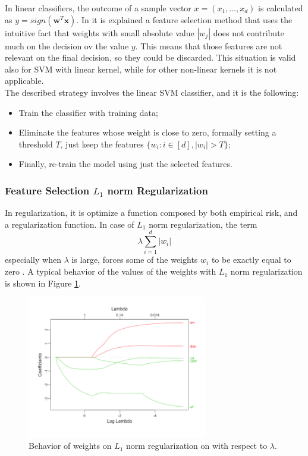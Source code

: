 In linear classifiers, the outcome of a sample vector $x = (x_1, \dots, x_d)$ is calculated as $y=sign(\mathbf{w}^T\mathbf{x})$. In \cite{Brank2002FeatureSU} it is explained a feature selection method that uses the intuitive fact that weights with small absolute value $|w_j|$ does not contribute much on the decision ov the value $y$. This means that those features are not relevant on the final decision, so they could be discarded. This situation is valid also for SVM with linear kernel, while for other non-linear kernels it is not applicable.\\
The described strategy involves the linear SVM classifier, and it is the following:
\begin{itemize}
	\item Train the classifier with training data;
	\item Eliminate the features whose weight is close to zero, formally setting a threshold $T$, just keep the features $\{w_i : i \in [d], |w_i| > T\}$;
	\item Finally, re-train the model using just the selected features.
\end{itemize}

\subsubsection{Feature Selection $L_1$ norm Regularization}

In regularization, it is optimize a function composed by both empirical risk, and a regularization function. In case of $L_1$ norm regularization, the term
\[ \lambda \sum_{i = 1}^{d} |w_i| \]
especially when $\lambda$ is large, forces some of the weights $w_i$ to be exactly equal to zero \cite{article-lasso}. A typical behavior of the values of the weights with $L_1$ norm regularization is shown in Figure \ref{fig:lasso}.

\begin{figure}[ht]
	\centering
	\includegraphics[width=0.7\textwidth]{figures/lasso.png}
	\caption{Behavior of weights on $L_1$ norm regularization on with respect to $\lambda$.}
	\label{fig:lasso}
\end{figure}

